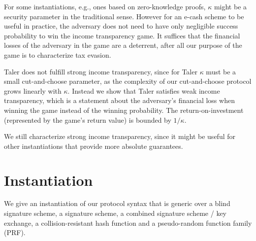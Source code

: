 For some instantiations, e.g., ones based on zero-knowledge proofs, $\kappa$
might be a security parameter in the traditional sense.  However for an e-cash
scheme to be useful in practice, the adversary does not need to have only
negligible success probability to win the income transparency game.  It
suffices that the financial losses of the adversary in the game are a
deterrent, after all our purpose of the game is to characterize tax evasion.

Taler does not fulfill strong income transparency, since for Taler $\kappa$ must
be a small cut-and-choose parameter, as the complexity of our cut-and-choose
protocol grows linearly with $\kappa$.  Instead we show that Taler satisfies
weak income transparency, which is a statement about the adversary's financial
loss when winning the game instead of the winning probability.  The
return-on-investment (represented by the game's return value) is bounded by
$1/\kappa$.

We still characterize strong income transparency, since it might be useful
for other instantiations that provide more absolute guarantees.

\section{Instantiation}
We give an instantiation of our protocol syntax that is generic over
a blind signature scheme, a signature scheme, a combined signature scheme / key
exchange, a collision-resistant hash function and a pseudo-random function family (PRF).

